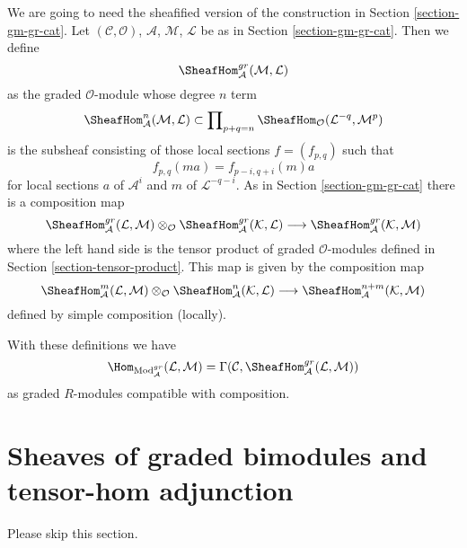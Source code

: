 \medskip\noindent
We are going to need the sheafified version of the construction
in Section \ref{section-gm-gr-cat}.
Let $(\mathcal{C}, \mathcal{O})$, $\mathcal{A}$,
$\mathcal{M}$, $\mathcal{L}$ be as in Section \ref{section-gm-gr-cat}.
Then we define
$$
\SheafHom^{gr}_\mathcal{A}(\mathcal{M}, \mathcal{L})
$$
as the graded $\mathcal{O}$-module whose degree $n$ term
$$
\SheafHom^n_\mathcal{A}(\mathcal{M}, \mathcal{L})
\subset
\prod\nolimits_{p + q = n}
\SheafHom_\mathcal{O}(\mathcal{L}^{-q}, \mathcal{M}^p)
$$
is the subsheaf consisting of those local sections $f = (f_{p, q})$ such that
$$
f_{p, q}(m a) = f_{p - i, q + i}(m)a
$$
for local sections $a$ of $\mathcal{A}^i$ and
$m$ of $\mathcal{L}^{-q - i}$. As in Section \ref{section-gm-gr-cat}
there is a composition map
$$
\SheafHom^{gr}_\mathcal{A}(\mathcal{L}, \mathcal{M}) \otimes_\mathcal{O}
\SheafHom^{gr}_\mathcal{A}(\mathcal{K}, \mathcal{L})
\longrightarrow
\SheafHom^{gr}_\mathcal{A}(\mathcal{K}, \mathcal{M})
$$
where the left hand side is the tensor product of graded $\mathcal{O}$-modules
defined in Section \ref{section-tensor-product}.
This map is given by the composition map
$$
\SheafHom^m_\mathcal{A}(\mathcal{L}, \mathcal{M}) \otimes_\mathcal{O}
\SheafHom^n_\mathcal{A}(\mathcal{K}, \mathcal{L}) \longrightarrow
\SheafHom^{n + m}_\mathcal{A}(\mathcal{K}, \mathcal{M})
$$
defined by simple composition (locally).

\medskip\noindent
With these definitions we have
$$
\Hom_{\text{Mod}^{gr}_\mathcal{A}}(\mathcal{L}, \mathcal{M}) =
\Gamma(\mathcal{C}, \SheafHom^{gr}_\mathcal{A}(\mathcal{L}, \mathcal{M}))
$$
as graded $R$-modules compatible with composition.







\section{Sheaves of graded bimodules and tensor-hom adjunction}
\label{section-graded-bimodules}

\noindent
Please skip this section.

